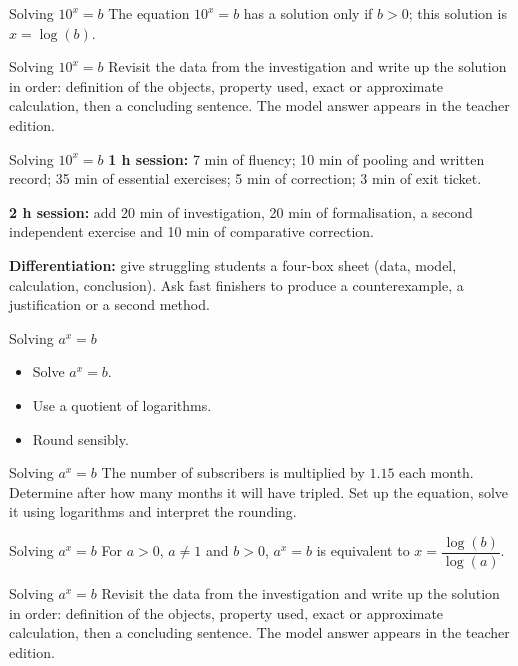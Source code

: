\documentclass[aspectratio=169,10pt]{beamer}
\begin{document}
\begin{frame}{Solving \(10^x=b\)}
The equation \(10^x=b\) has a solution only if \(b>0\); this solution is \(x=\log(b)\).
\end{frame}
\begin{frame}{Solving \(10^x=b\)}
Revisit the data from the investigation and write up the solution in order: definition of the objects, property used, exact or approximate calculation, then a concluding sentence. The model answer appears in the teacher edition.
\end{frame}
\begin{frame}{Solving \(10^x=b\)}
\textbf{1 h session:} 7 min of fluency; 10 min of pooling and written record; 35 min of essential exercises; 5 min of correction; 3 min of exit ticket.

\textbf{2 h session:} add 20 min of investigation, 20 min of formalisation, a second independent exercise and 10 min of comparative correction.

\textbf{Differentiation:} give struggling students a four-box sheet (data, model, calculation, conclusion). Ask fast finishers to produce a counterexample, a justification or a second method.
\end{frame}
\begin{frame}{Solving \(a^x=b\)}
\begin{itemize}
\item Solve \(a^x=b\).
\item Use a quotient of logarithms.
\item Round sensibly.

\end{itemize}
\end{frame}
\begin{frame}{Solving \(a^x=b\)}
The number of subscribers is multiplied by \(1.15\) each month. Determine after how many months it will have tripled. Set up the equation, solve it using logarithms and interpret the rounding.
\end{frame}
\begin{frame}{Solving \(a^x=b\)}
For \(a>0\), \(a\neq1\) and \(b>0\), \(a^x=b\) is equivalent to \(x=\dfrac{\log(b)}{\log(a)}\).
\end{frame}
\begin{frame}{Solving \(a^x=b\)}
Revisit the data from the investigation and write up the solution in order: definition of the objects, property used, exact or approximate calculation, then a concluding sentence. The model answer appears in the teacher edition.
\end{frame}
\end{document}
